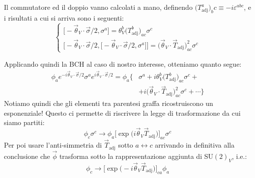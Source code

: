 \documentclass[../main.tex]{subfiles}
\begin{document}
\begin{enumerate}
\begin{nota}
        Il commutatore ed il doppio vanno calcolati a mano, definendo $\big(T_\text{adj}^a\big)_bc\equiv -i\varepsilon^{abc}$, e i risultati a cui si arriva sono i seguenti:
        \[
        \begin{cases}
            \big[-\Vec{\theta}_V\cdot{\Vec{\sigma}}/{2},\sigma^a\big] = \theta_V^b\big(T_\text{adj}^b\big)_{ac}\sigma^c \\
            \big[-\Vec{\theta}_V\cdot{\Vec{\sigma}}/{2},\big[-\Vec{\theta}_V\cdot{\Vec{\sigma}}/{2},\sigma^a\big]\big] = \big(\Vec{\theta}_V\cdot\Vec{T}_\text{adj}\big)^2_{ac}\sigma^c
        \end{cases}
        \]

        Applicando quindi la BCH al caso di nostro interesse, otteniamo quanto segue:
        \begin{align*}
            \phi_a e^{-i\Vec{\theta}_V\cdot\Vec{\sigma}/{2}}\sigma^a e^{i\Vec{\theta}_V\cdot\Vec{\sigma}/{2}} =\phi_a\big\{& \sigma^a + i \theta_V^b\big(T_\text{adj}^b\big)_{ac}\sigma^c +\\
            & + i\big(\Vec{\theta}_V \cdot \Vec{T}_\text{adj} \big)^2_{ac} \sigma^c + \cdots \big\}
        \end{align*}
        Notiamo quindi che gli elementi tra parentesi graffa ricostruiscono un esponenziale! Questo ci permette di riscrivere la legge di trasformazione da cui siamo partiti:
        \[
        \phi_c\sigma^c \rightarrow  \phi_a\big[\exp\big(i\Vec{\theta}_V \Vec{T}_\text{adj})\big]_{ac}\sigma^c
        \]
        Per poi usare l'anti-simmetria di $\Vec{T}_\text{adj}$ sotto $a\leftrightarrow c$ arrivando in definitiva alla conclusione che $\Vec\phi$ trasforma sotto la rappresentazione aggiunta di SU$(2)_V$, i.e.:
        \begin{equation}
            \boxed{\phi_c \rightarrow \big[\exp\big(-i\Vec{\theta}_V \Vec{T}_\text{adj})\big]_{ca} \phi_a}
            \label{eq:phi_SU2_V_adjoint_transform}
        \end{equation}
        \label{note:singlet_and_adjoint}
    \end{nota}
    

\end{enumerate}
\end{document}
